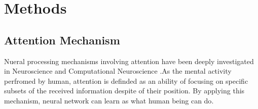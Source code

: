 \documentclass[journal]{IEEEtran}
\begin{document}
%




\section{Methods}

\subsection{Attention Mechanism}
Nueral processing mechanisms involving attention have been deeply investigated in Neuroscience and Computational Neuroscience \cite{itti1998model,desimone1995neural}.As the mental activity perfromed by human, attention is definded as an ability of focusing on specific subsets of the received information despite of their position. By applying this mechanism, neural network can learn as what human being can do\cite{zhou2016attention,bahdanau2014neural}.
\end{document}
